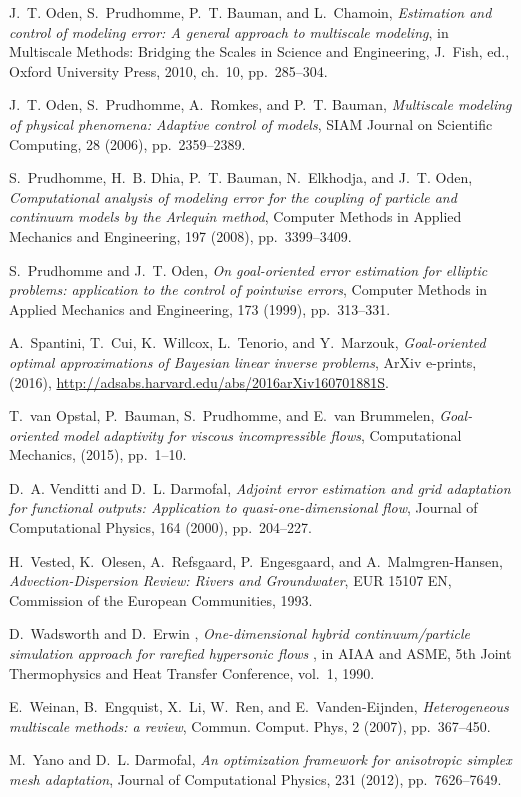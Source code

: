 \documentclass[review]{siamart0516}
\providecommand{\DIFaddtex}[1]{{\protect\color{blue} \sf #1}} %
\providecommand{\DIFaddbegin}{} %
\providecommand{\DIFaddend}{} %
\providecommand{\DIFadd}[1]{\texorpdfstring{\DIFaddtex{#1}}{#1}} %
\newcommand{\DIFaddincludegraphics}[2][]{{\color{blue}\fbox{\DIFOincludegraphics[#1]{#2}}}} %
\DeclareRobustCommand{\DIFaddbegin}{\DIFOaddbegin \let\includegraphics\DIFaddincludegraphics} %
\DeclareRobustCommand{\DIFaddend}{\DIFOaddend \let\includegraphics\DIFOincludegraphics} %
\begin{document}
\begin{thebibliography}{10}
{\sc J.~T. Oden, S.~Prudhomme, P.~T. Bauman, and L.~Chamoin}, {\em Estimation
  and control of modeling error: A general approach to multiscale modeling}, in
  Multiscale Methods: Bridging the Scales in Science and Engineering, J.~Fish,
  ed., Oxford University Press, 2010, ch.~10, pp.~285--304.

{\sc J.~T. Oden, S.~Prudhomme, A.~Romkes, and P.~T. Bauman}, {\em Multiscale
  modeling of physical phenomena: Adaptive control of models}, SIAM Journal on
  Scientific Computing, 28 (2006), pp.~2359--2389.

{\sc S.~Prudhomme, H.~B. Dhia, P.~T. Bauman, N.~Elkhodja, and J.~T. Oden}, {\em
  Computational analysis of modeling error for the coupling of particle and
  continuum models by the {A}rlequin method}, Computer Methods in Applied
  Mechanics and Engineering, 197 (2008), pp.~3399--3409.

{\sc S.~Prudhomme and J.~T. Oden}, {\em On goal-oriented error estimation for
  elliptic problems: application to the control of pointwise errors}, Computer
  Methods in Applied Mechanics and Engineering, 173 (1999), pp.~313--331.

{\sc A.~Spantini, T.~Cui, K.~Willcox, L.~Tenorio, and Y.~Marzouk}, {\em
  Goal-oriented optimal approximations of {B}ayesian linear inverse problems},
  ArXiv e-prints,  (2016),
  \url{http://adsabs.harvard.edu/abs/2016arXiv160701881S}.

{\sc T.~van Opstal, P.~Bauman, S.~Prudhomme, and E.~van Brummelen}, {\em
  Goal-oriented model adaptivity for viscous incompressible flows},
  Computational Mechanics,  (2015), pp.~1--10.

{\sc D.~A. Venditti and D.~L. Darmofal}, {\em Adjoint error estimation and grid
  adaptation for functional outputs: Application to quasi-one-dimensional
  flow}, Journal of Computational Physics, 164 (2000), pp.~204--227.

{\sc H.~Vested, K.~Olesen, A.~Refsgaard, P.~Engesgaard, and
  A.~Malmgren-Hansen}, {\em Advection-Dispersion Review: Rivers and
  Groundwater}, EUR 15107 EN, Commission of the European Communities, 1993.
\DIFaddbegin 

{\sc \DIFadd{D.~Wadsworth and D.~Erwin}}\DIFadd{, }{\em \DIFadd{One-dimensional hybrid continuum/particle
  simulation approach for rarefied hypersonic flows}}\DIFadd{, in AIAA and ASME, 5th
  Joint Thermophysics and Heat Transfer Conference, vol.~1, 1990.
}\DIFaddend 

{\sc E.~Weinan, B.~Engquist, X.~Li, W.~Ren, and E.~Vanden-Eijnden}, {\em
  Heterogeneous multiscale methods: a review}, Commun. Comput. Phys, 2 (2007),
  pp.~367--450.

{\sc M.~Yano and D.~L. Darmofal}, {\em An optimization framework for
  anisotropic simplex mesh adaptation}, Journal of Computational Physics, 231
  (2012), pp.~7626--7649.

\end{thebibliography}
\end{document}
